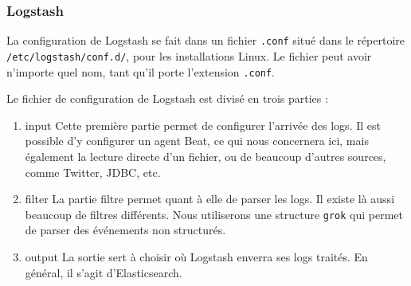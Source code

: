\documentclass[paper=a4, fontsize=11pt]{scrartcl}
\begin{document}
\subsubsection{Logstash} \label{configureLogstash}
La configuration de Logstash se fait dans un fichier \verb,.conf, situé dans le répertoire \verb,/etc/logstash/conf.d/,, pour les installations Linux. Le fichier peut avoir n'importe quel nom, tant qu'il porte l'extension \verb,.conf,.

Le fichier de configuration de Logstash est divisé en trois parties :
\begin{enumerate}
    \item input
    \subitem Cette première partie permet de configurer l'arrivée des logs. Il est possible d'y configurer un agent Beat, ce qui nous concernera ici, mais également la lecture directe d'un fichier, ou de beaucoup d'autres sources, comme Twitter, JDBC, etc.
    \item filter
    \subitem La partie filtre permet quant à elle de parser les logs. Il existe là aussi beaucoup de filtres différents. Nous utiliserons une structure \verb,grok, qui permet de parser des événements non structurés.
    \item output
    \subitem La sortie sert à choisir où Logstash enverra ses logs traités. En général, il s'agit d'Elasticsearch.
\end{enumerate}
\end{document}

